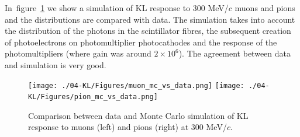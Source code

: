 In~figure~\ref{fig:KL_mc_vs_data} we show a simulation of KL response to 300 MeV/$c$ muons and pions and the distributions are compared with data.
The simulation takes into account the distribution of the photons in the scintillator fibres, the subsequent creation of photoelectrons on photomultiplier photocathodes and the response of the photomultipliers (where gain was around $2 \times 10^6$).
The agreement between data and simulation is very good.


   \begin{figure}[htb!]
   	\begin{center}
   		\texttt{[image: ./04-KL/Figures/muon\_mc\_vs\_data.png]}  		\texttt{[image: ./04-KL/Figures/pion\_mc\_vs\_data.png]}
   		\caption{Comparison between data and Monte Carlo simulation of KL response to muons (left) and pions (right) at 300 MeV/$c$.}
   		\label{fig:KL_mc_vs_data}
   	\end{center}
   \end{figure}
